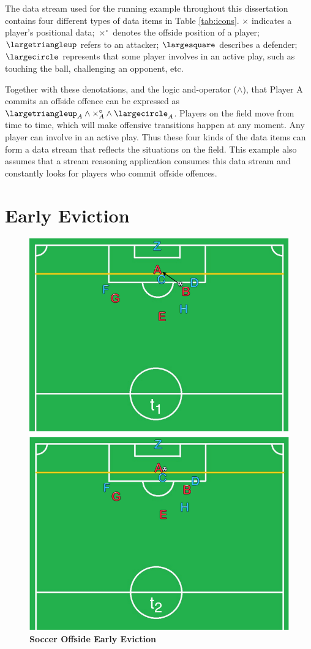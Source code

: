 The data stream used for the running example throughout this dissertation contains four different types of data items in Table \ref{tab:icons}.
$\times$ indicates a player's positional data;
$\times^{\circ}$ denotes the offside position of a player; 
$\largetriangleup$ refers to an attacker;
$\largesquare$ describes a defender;
$\largecircle$ represents that some player involves in an active play, such as touching the ball, challenging an opponent, etc.

Together with these denotations, and the logic and-operator ($\wedge$), that Player A commits an offside offence can be expressed as
$\largetriangleup_{A} \wedge \times^{\circ}_{A} \wedge \largecircle_{A}$. 
Players on the field move from time to time, which will make offensive transitions happen at any moment.
Any player can involve in an active play. 
Thus these four kinds of the data items can form a data stream that reflects the situations on the field.
This example also assumes that a stream reasoning application consumes this data stream and constantly looks for players who commit offside offences. 
%
\section{Early Eviction}

\begin{figure}[!htbp]
	\centering
	\includegraphics[width=5in]{img/1-seeh.pdf}
	\caption{\textbf{Soccer Offside Early Eviction}}
	\label{fig:1-seeh} 
\end{figure}

